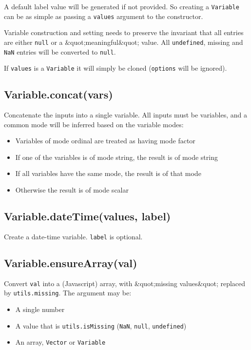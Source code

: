 \documentclass{article}
\begin{document}
A default label value will be generated if not provided. So creating a \texttt{Variable} can
be as simple as passing a \texttt{values} argument to the constructor.


Variable construction and setting needs to preserve the invariant that all entries are
either \texttt{null} or a \&quot;meaningful\&quot; value. All \texttt{undefined}, missing and \texttt{NaN} entries will be
converted to \texttt{null}.


If \texttt{values} is a \texttt{Variable} it will simply be cloned (\texttt{options} will be ignored).


    \subsection{Variable.concat(vars)}
    Concatenate the inputs into a single variable. All inputs must be variables,
and a common mode will be inferred based on the variable modes:


\begin{itemize}

\item Variables of mode ordinal are treated as having mode factor

\item If one of the variables is of mode string, the result is of mode string

\item If all variables have the same mode, the result is of that mode

\item Otherwise the result is of mode scalar

\end{itemize}

    \subsection{Variable.dateTime(values, label)}
    Create a date-time variable. \texttt{label} is optional.


    \subsection{Variable.ensureArray(val)}
    Convert \texttt{val} into a (Javascript) array, with \&quot;missing values\&quot;
replaced by \texttt{utils.missing}. The argument may be:


\begin{itemize}

\item A single number

\item A value that is \texttt{utils.isMissing}  (\texttt{NaN}, \texttt{null}, \texttt{undefined})

\item An array, \texttt{Vector} or \texttt{Variable}

\end{itemize}
\end{document}
